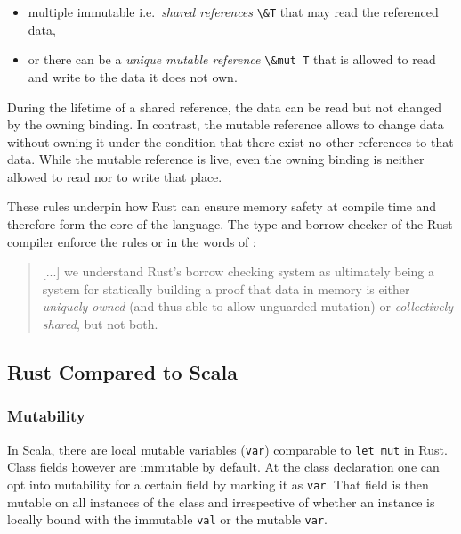 \begin{itemize}
\tightlist
\item
  multiple immutable i.e.~\emph{shared references}
  \passthrough{\lstinline!\&T!} that may read the referenced data,
\item
  or there can be a \emph{unique mutable reference}
  \passthrough{\lstinline!\&mut T!} that is allowed to read and write
  to the data it does not own.
\end{itemize}

During the lifetime of a shared reference, the data can be read but not
changed by the owning binding. In contrast, the mutable reference allows
to change data without owning it under the condition that there exist no
other references to that data. While the mutable reference is live, even
the owning binding is neither allowed to read nor to write that place.

These rules underpin how Rust can ensure memory safety at compile time
and therefore form the core of the language. The type and borrow checker
of the Rust compiler enforce the rules or in the words of \citet{oxide}:

\begin{quote}
{[...]} we understand Rust's borrow checking system as ultimately being a system
for statically building a proof that data in memory is either
\emph{uniquely owned} (and thus able to allow unguarded mutation) or
\emph{collectively shared}, but not both.
\end{quote}

\subsection{Rust Compared to Scala}

\subsubsection{Mutability}

In Scala, there are local mutable variables (\passthrough{\lstinline!var!})
comparable to \passthrough{\lstinline!let mut!} in Rust. Class fields however
are immutable by default. At the class declaration one can opt into mutability
for a certain field by marking it as \passthrough{\lstinline!var!}. That field
is then mutable on all instances of the class and irrespective of whether an
instance is locally bound with the immutable \passthrough{\lstinline!val!} or
the mutable \passthrough{\lstinline!var!}.

